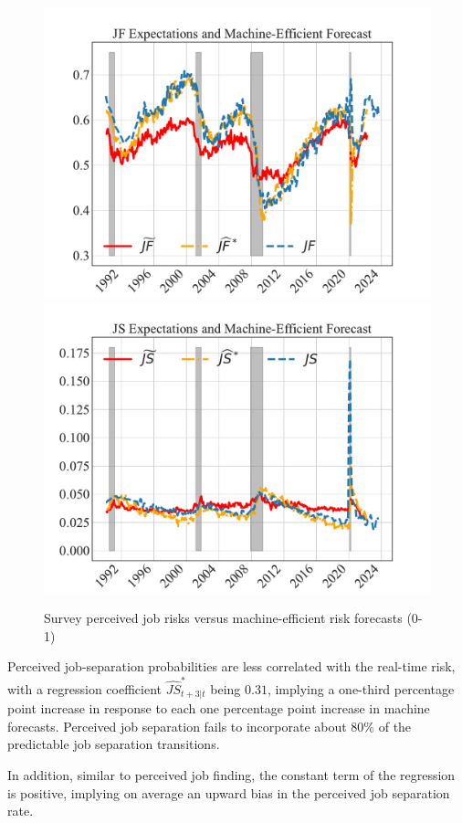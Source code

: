 \begin{figure}[pt] 
\centering 
	\caption{Survey perceived job risks versus machine-efficient risk forecasts (0-1)} 
	\label{fig:survey_versus_machine}
\includegraphics[width=0.7\linewidth]{text/chapter2/Figures/real_time_survey_machine_realization_1step_JF.pdf} \\
\includegraphics[width=0.7\linewidth]{text/chapter2/Figures/real_time_survey_machine_realization_1step_JS.pdf} 
\end{figure}

Perceived job-separation probabilities are less correlated with the real-time risk, with a regression coefficient $\widehat{JS}^*_{t+3|t}$ being $0.31$, implying a one-third percentage point increase in response to each one percentage point increase in machine forecasts. Perceived job separation fails to incorporate about 80\% of the predictable job separation transitions. 

In addition, similar to perceived job finding, the constant term of the regression is positive, implying on average an upward bias in the perceived job separation rate.

